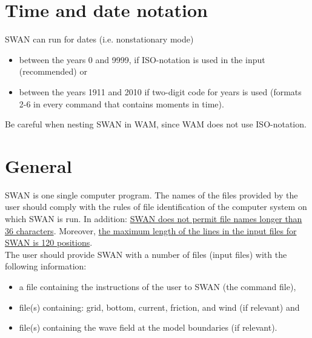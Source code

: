 \documentclass[12pt]{book}
\begin{document}
\section{Time and date notation}
SWAN can run for dates (i.e. nonstationary mode)
\begin{itemize}
  \item between the years 0 and 9999, if ISO-notation is used in the input (recommended) or
  \item between the years 1911 and 2010 if two-digit code for years is used (formats 2-6 in every
        command that contains moments in time).
\end{itemize}
Be careful when nesting SWAN in WAM, since WAM does not use ISO-notation.

 \label{ch:inout}

\section{General}

SWAN is one single computer program. The names of the files provided by the user should comply with
the rules of file identification of the computer system on which SWAN is run. In addition: \underline{SWAN does not
permit file names longer than 36 characters}. Moreover, \underline{the maximum length of the lines in the input files
for SWAN is 120 positions}.
\\[2ex]
\noindent
The user should provide SWAN with a number of files (input files) with the following information:
\begin{itemize}
  \item a file containing the instructions of the user to SWAN (the command file),
  \item file(s) containing: grid, bottom, current, friction, and wind (if relevant) and
  \item file(s) containing the wave field at the model boundaries (if relevant).
\end{itemize}
\end{document}
